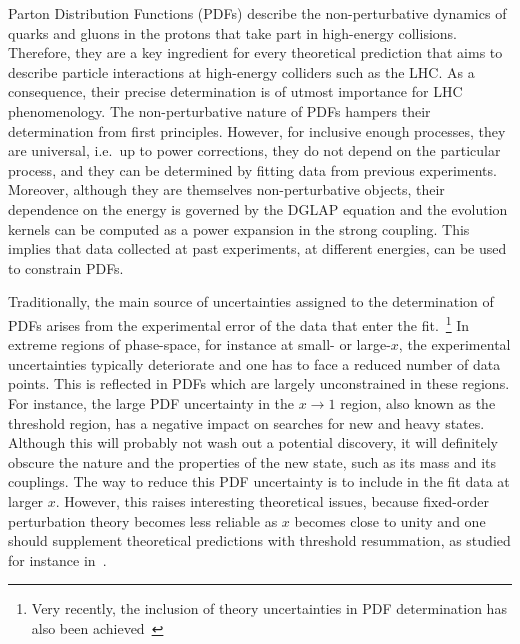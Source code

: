 Parton Distribution Functions (PDFs) describe the non-perturbative dynamics of quarks and gluons in the protons that take part in high-energy collisions. Therefore, they are a key ingredient for every theoretical prediction that aims to describe particle interactions at high-energy colliders such as the LHC. As a consequence, their precise determination is of utmost importance for LHC phenomenology. 
%
The non-perturbative nature of PDFs hampers their determination from first principles.
%
However, for inclusive enough processes, they are universal, i.e.\, up to power corrections, they do not depend on the particular process, and they can be determined by fitting data from previous experiments. Moreover, although they are themselves non-perturbative objects, their dependence on the energy is governed by the DGLAP equation and the evolution kernels can be computed as a power expansion in the strong coupling. This implies that data collected at past experiments, at different energies, can be used to constrain PDFs. 

Traditionally, the main source of uncertainties assigned to the determination of PDFs arises from the experimental error of the data that enter the fit.~\footnote{Very recently, the inclusion of theory uncertainties in PDF determination has also been achieved~\cite{Harland-Lang:2018bxd,AbdulKhalek:2019ihb,AbdulKhalek:2019bux}} In extreme regions of phase-space, for instance at small- or large-$x$, the experimental uncertainties typically deteriorate and one has to face a reduced number of data points. This is reflected in PDFs which are largely unconstrained in these regions. 
%
For instance, the large PDF uncertainty in the $x\to 1$ region, also known as the threshold region, has a negative impact on searches for new and heavy states.
%
 Although this will probably not wash out a potential discovery, it will definitely obscure the nature and the properties of the new state, such as its mass and its couplings. 
%
The way to reduce this PDF uncertainty is to include in the fit data at larger $x$. However, this raises interesting theoretical issues, because fixed-order perturbation theory becomes less reliable as $x$ becomes close to unity and one should supplement theoretical predictions with threshold resummation, as studied for instance in~\cite{Corcella:2005us,Sato:2013wea,Westmark:2013vea,Bonvini:2015ira,Accardi:2014qda}.



